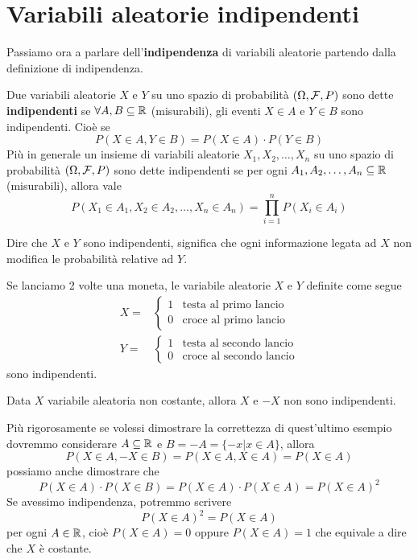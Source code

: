 \section{Variabili aleatorie indipendenti}
Passiamo ora a parlare dell'\textbf{indipendenza} di variabili aleatorie partendo dalla definizione
di indipendenza.

\begin{definition}
	Due variabili aleatorie $X$ e $Y$ su uno spazio di probabilità $(\Omega, \mathcal{F}, P)$ sono dette
	\textbf{indipendenti} se $\forall A, B \subseteq \mathbb{R}$ (misurabili), gli eventi $X \in A$ e
	$Y \in B$ sono indipendenti. Cioè se
	\[ P(X \in A, Y \in B) = P(X \in A) \cdot P(Y \in B) \]
	Più in generale un insieme di variabili aleatorie $X_1, X_2, \dots, X_n$ su uno spazio di
	probabilità $(\Omega, \mathcal{F}, P)$ sono dette indipendenti se per ogni
	$A_1, A_2, \dots, A_n \subseteq \mathbb{R}$ (misurabili), allora vale
	\[ P(X_1 \in A_1, X_2 \in A_2, \dots, X_n \in A_n) = \prod_{i=1}^n P(X_i \in A_i) \]
\end{definition}

Dire che $X$ e $Y$ sono indipendenti, significa che ogni informazione legata ad $X$ non modifica
le probabilità relative ad $Y$.

\begin{example}
	Se lanciamo 2 volte una moneta, le variabile aleatorie $X$ e $Y$ definite come segue
	\begin{align*}
		X = & \begin{cases}
			      1 & \text{testa al primo lancio} \\
			      0 & \text{croce al primo lancio}
		      \end{cases}   \\[1ex]
		Y = & \begin{cases}
			      1 & \text{testa al secondo lancio} \\
			      0 & \text{croce al secondo lancio}
		      \end{cases}
	\end{align*}
	sono indipendenti.
\end{example}

\begin{example}
	Data $X$ variabile aleatoria non costante, allora $X$ e $-X$ non sono indipendenti.
\end{example}

Più rigorosamente se volessi dimostrare la correttezza di quest'ultimo esempio dovremmo considerare
$A \subseteq \mathbb{R}$ e $B = -A = \{ -x | x \in A \}$, allora
\[ P(X \in A, -X \in B) = P(X \in A, X \in A) = P(X \in A) \]
possiamo anche dimostrare che
\[ P(X \in A) \cdot P(X \in B) = P(X \in A) \cdot P(X \in A) = P(X \in A)^2 \]
Se avessimo indipendenza, potremmo scrivere
\[ P(X \in A)^2 = P(X \in A) \]
per ogni $A \in \mathbb{R}$, cioè $P(X \in A) = 0$ oppure $P(X \in A) = 1$ che equivale a dire che $X$ è
costante.


